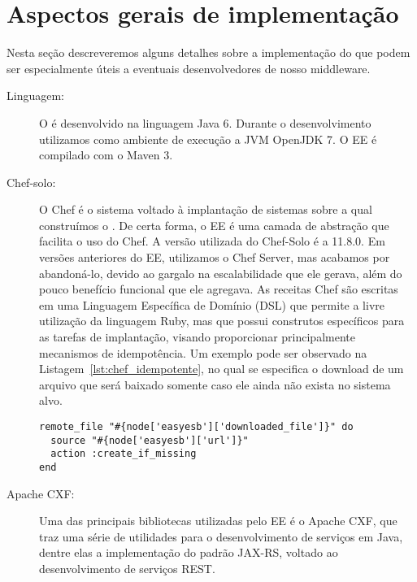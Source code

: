 \section{Aspectos gerais de implementação}
\label{sec:implementacao}

Nesta seção descreveremos alguns detalhes sobre a implementação do \ee que 
podem ser especialmente úteis a eventuais desenvolvedores de nosso middleware.

\begin{description}

\item [Linguagem:] 

O \ee é desenvolvido na linguagem Java 6. 
Durante o desenvolvimento utilizamos como ambiente de execução
a JVM OpenJDK 7. O EE é compilado com o Maven 3.

\item [Chef-solo:] 

O Chef é o sistema voltado à implantação de sistemas sobre a qual construímos o \ee.
De certa forma, o EE é uma camada de abstração que facilita o uso do Chef.
A versão utilizada do Chef-Solo é a 11.8.0.
Em versões anteriores do EE, utilizamos o Chef Server,
mas acabamos por abandoná-lo, devido ao gargalo na escalabilidade
que ele gerava, além do pouco benefício funcional que ele agregava.
As receitas Chef são escritas em uma Linguagem Específica de Domínio (DSL) 
que permite a livre
utilização da linguagem Ruby, mas que possui construtos
específicos para as tarefas de implantação, visando proporcionar
principalmente mecanismos de idempotência. Um exemplo pode ser
observado na Listagem~\ref{lst:chef_idempotente}, no qual
se especifica o download de um arquivo que será
baixado somente caso ele ainda não exista no sistema alvo.

\begin{lstlisting}[frame=trbl, label=lst:chef_idempotente, caption=Trecho de receita Chef que ilustra uso de idempotência.]
remote_file "#{node['easyesb']['downloaded_file']}" do
  source "#{node['easyesb']['url']}"
  action :create_if_missing
end
\end{lstlisting}

\item [Apache CXF:]

Uma das principais bibliotecas utilizadas pelo EE é o Apache CXF,
que traz uma série de utilidades para o desenvolvimento de serviços em Java,
dentre elas a implementação do padrão JAX-RS, voltado ao desenvolvimento de serviços REST.


\end{description}
